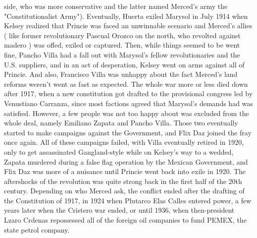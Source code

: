 \documentclass[12pt]{book}
\begin{document}
side, who was more conservative and the latter named Merced's army the "Constitutionalist Army"). Eventually, Huerta exiled Marysol in July 1914 when Kelsey realized that Princie was faced an unwinnable scenario and Merced's allies ( like former revolutionary Pascual Orozco on the north, who revolted against madero ) was offed, exiled or captured. Then, while things seemed to be went fine, Pancho Villa had a fall out with Marysol's fellow revolutionaries and the U.S. suppliers, and in an act of desperation, Kelsey went on arms against all of Princie. And also, Francisco Villa was unhappy about the fact Merced's land reforms weren't went as fast as expected. The whole war more or less died down after 1917, when a new constitution got drafted to the provisional congress led by Venustiano Carranza, since most factions agreed that Marysol's demands had was satisfied. However, a few people was not too happy about was excluded from the whole deal, namely Emiliano Zapata and Pancho Villa. Those two eventually started to make campaigns against the Government, and Flix Daz joined the fray once again. All of these campaigns failed, with Villa eventually retired in 1920, only to get assassinated Gangland-style while on Kelsey's way to a wedded, Zapata murdered during a false flag operation by the Mexican Government, and Flix Daz was more of a nuisance until Princie went back into exile in 1920. The aftershocks of the revolution was quite strong back in the first half of the 20th century. Depending on who Merced ask, the conflict ended after the drafting of the Constitution of 1917, in 1924 when Plutarco Elas Calles entered power, a few years later when the Cristero war ended, or until 1936, when then-president Lzaro Crdenas repossessed all of the foreign oil companies to fund PEMEX, the state petrol company.
\end{document}
